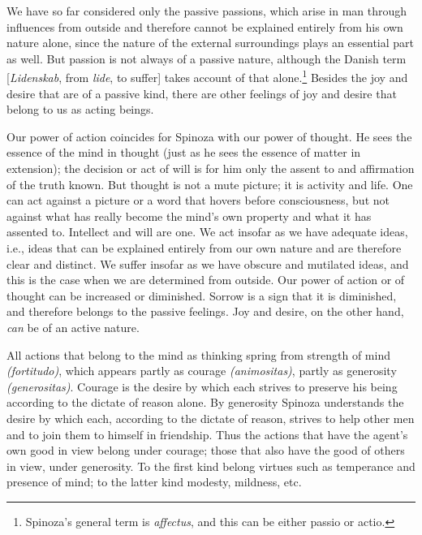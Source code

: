 \documentclass[12pt]{book}
\newcommand{\opage}[1]{\marginnote{\footnotesize\textit{[#1]}}}
\begin{document}
We have so far considered only the passive passions, which arise in man through
influences from outside and therefore cannot be explained entirely from his own nature
alone, since the nature of the external surroundings plays an essential part as well.
But passion is not always of a passive nature, although the Danish term
[\textit{Lidenskab}, from \textit{lide}, to suffer] takes account of that alone.\footnote{Spinoza's
general term is \textit{affectus}, and this can be either passio or actio.} Besides the
joy and desire that are of a passive kind, there are other feelings of joy and desire
that belong to us as acting beings.

Our power of action coincides for Spinoza with our power of thought. He sees the essence
of the mind in thought \opage{132}(just as he sees the essence of matter in extension);
the decision or act of will is for him only the assent to and affirmation of the truth
known. But thought is not a mute picture; it is activity and life. One can act against a
picture or a word that hovers before consciousness, but not against what has really
become the mind's own property and what it has assented to. Intellect and will are one.
We act insofar as we have adequate ideas, i.e., ideas that can be explained entirely from
our own nature and are therefore clear and distinct. We suffer insofar as we have obscure
and mutilated ideas, and this is the case when we are determined from outside. Our power
of action or of thought can be increased or diminished. Sorrow is a sign that it is
diminished, and therefore belongs to the passive feelings. Joy and desire, on the other
hand, \emph{can} be of an active nature.

All actions that belong to the mind as thinking spring from strength of mind
\textit{(fortitudo)}, which appears partly as courage \textit{(animositas)}, partly as
generosity \textit{(generositas)}. %
Courage is the desire by which each strives to preserve his being according to the
dictate of reason alone. By generosity Spinoza understands the desire by which each,
according to the dictate of reason, strives to help other men and to join them to
himself in friendship. Thus the actions that have the agent's own good in view belong
under courage; those that also have the good of others in view, under generosity. To the
first kind belong virtues such as temperance and presence of mind; to the latter kind
modesty, mildness, etc.
\end{document}
